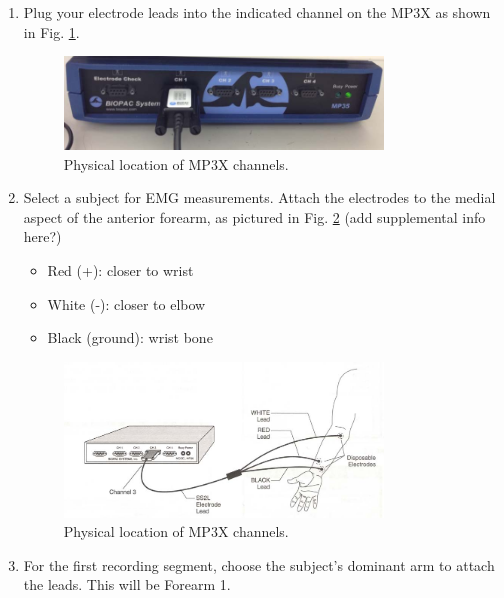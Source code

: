 \documentclass{article}
\begin{document}
\begin{enumerate}
	\item Plug your electrode leads into the indicated channel on the MP3X as shown in Fig. \ref{channel2}.
		\begin{figure}[h]
	\includegraphics[width=0.8\textwidth]{../images/EMG_I_6.jpg}
		\centering
		\caption{Physical location of MP3X channels.}
		\label{channel2}
		\end{figure}
	
	\item Select a subject for EMG measurements. Attach the electrodes to the medial aspect of the anterior forearm, as pictured in Fig. \ref{forearm} (add supplemental info here?)
		\begin{itemize}
			\item Red (+): closer to wrist
			\item White (-): closer to elbow
			\item Black (ground): wrist bone
		\end{itemize}
	
		\begin{figure}[h]
	\includegraphics[width=0.8\textwidth]{../images/EMG_I_7.jpg}
		\centering
		\caption{Physical location of MP3X channels.}
		\label{forearm}
		\end{figure}

	\item For the first recording segment, choose the subject's dominant arm to attach the leads. This will be Forearm 1.
\end{enumerate}
\end{document}
